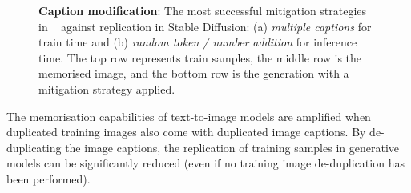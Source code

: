 \documentclass[conference,table]{IEEEtran}
\begin{document}
\begin{figure}
    \centering
\hspace*{\fill}
    \hfill
        \hspace*{\fill}
    \caption{\textbf{Caption modification}: The most successful mitigation strategies in ~\cite{somepalli_understanding_2023} against replication in Stable Diffusion: (a) \textit{multiple captions} for train time and (b) \textit{random token / number addition} for inference time. The top row represents train samples, the middle row is the memorised image, and the bottom row is the generation with a mitigation strategy applied.}
    \label{fig:caption-modification}
\end{figure}


The memorisation capabilities of text-to-image models are amplified when duplicated training images also come with duplicated image captions. 
By de-duplicating the image captions, the replication of training samples in generative models can be significantly reduced (even if no training image de-duplication has been performed). 
\end{document}
